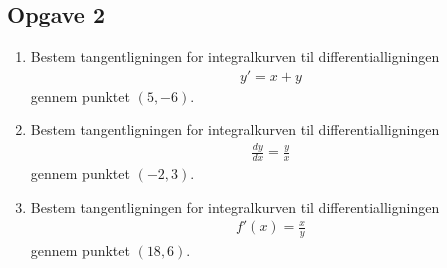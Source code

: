\subsection*{Opgave 2}
\begin{enumerate}[label=\roman*)]
	\item Bestem tangentligningen for integralkurven til differentialligningen
	\begin{align*}
		y' = x + y
	\end{align*}
	gennem punktet $(5,-6)$.
	\item Bestem tangentligningen for integralkurven til differentialligningen
	\begin{align*}
		\frac{d y}{d x} = \frac{y}{x}
	\end{align*}
	gennem punktet $(-2,3)$.
	\item Bestem tangentligningen for integralkurven til differentialligningen 
	\begin{align*}
		f'(x) = \frac{x}{y} 
	\end{align*}
	gennem punktet $(18,6)$.
\end{enumerate}
\newpage
